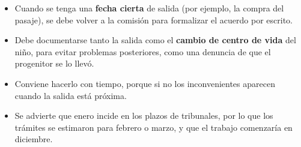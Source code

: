 \documentclass[12pt,oneside]{book}
\begin{document}
\begin{itemize}
    \item Cuando se tenga una \textbf{fecha cierta} de salida (por ejemplo, la compra del pasaje), se debe volver a la comisión para formalizar el acuerdo por escrito.
    \item Debe documentarse tanto la salida como el \textbf{cambio de centro de vida} del niño, para evitar problemas posteriores, como una denuncia de que el progenitor se lo llevó.
    \item Conviene hacerlo con tiempo, porque si no los inconvenientes aparecen cuando la salida está próxima.
    \item Se advierte que enero incide en los plazos de tribunales, por lo que los trámites se estimaron para febrero o marzo, y que el trabajo comenzaría en diciembre.
\end{itemize}

\end{document}

